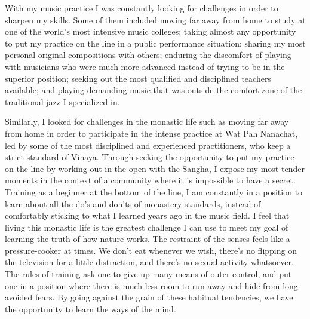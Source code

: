 With my music practice I was constantly looking for challenges in order
to sharpen my skills. Some of them included moving far away from home to
study at one of the world's most intensive music colleges; taking almost
any opportunity to put my practice on the line in a public performance
situation; sharing my most personal original compositions with others; 
enduring the discomfort of playing with musicians who were much more
advanced instead of trying to be in the superior position; seeking out
the most qualified and disciplined teachers available; and playing
demanding music that was outside the comfort zone of the traditional
jazz I specialized in. 

Similarly, I looked for challenges in the monastic life such as moving
far away from home in order to participate in the intense practice at
Wat Pah Nanachat, led by some of the most disciplined and experienced
practitioners, who keep a strict standard of Vinaya. Through seeking the
opportunity to put my practice on the line by working out in the open
with the Sangha, I expose my most tender moments in the context of a
community where it is impossible to have a secret. Training as a
beginner at the bottom of the line, I am constantly in a position to
learn about all the do's and don'ts of monastery standards, instead of
comfortably sticking to what I learned years ago in the music field. I
feel that living this monastic life is the greatest challenge I can use
to meet my goal of learning the truth of how nature works. The restraint
of the senses feels like a pressure-cooker at times. We don't eat
whenever we wish, there's no flipping on the television for a little
distraction, and there's no sexual activity whatsoever. The rules of
training ask one to give up many means of outer control, and put one in
a position where there is much less room to run away and hide from
long-avoided fears. By going against the grain of these habitual
tendencies, we have the opportunity to learn the ways of the mind. 

